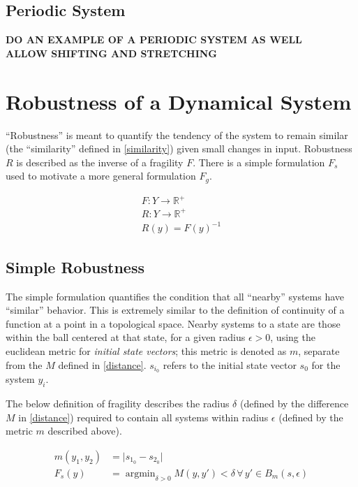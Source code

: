 \documentclass{article}
\DeclareMathOperator*{\argmin}{argmin}
\begin{document}
\subsection{Periodic System}
\textbf{DO AN EXAMPLE OF A PERIODIC SYSTEM AS WELL \\
  ALLOW SHIFTING AND STRETCHING}

\section{Robustness of a Dynamical System} \label{robustness}
``Robustness'' is meant to quantify the tendency of the system to remain similar (the ``similarity'' defined in \ref{similarity}) given small changes in input. Robustness $R$ is described as the inverse of a fragility $F$. There is a simple formulation $F_s$ used to motivate a more general formulation $F_g$.

\begin{align}
  F : Y \to \mathbb{R}^+ \\
  R : Y \to \mathbb{R}^+ \\
  R(y) = F(y)^{-1}
\end{align}

\subsection{Simple Robustness}
The simple formulation quantifies the condition that all ``nearby'' systems have ``similar'' behavior. This is extremely similar to the definition of continuity of a function at a point in a topological space. Nearby systems to a state are those within the ball centered at that state, for a given radius $\epsilon > 0$, using the euclidean metric for \textit{initial state vectors}; this metric is denoted as $m$, separate from the $M$ defined in \eqref{distance}. $s_{i_0}$ refers to the initial state vector $s_0$ for the system $y_i$.

The below definition of fragility describes the radius $\delta$ (defined by the difference $M$ in \eqref{distance}) required to contain all systems within radius $\epsilon$ (defined by the metric $m$ described above).

\begin{align}
  m(y_1, y_2) &= \lvert s_{1_0} - s_{2_0} \rvert \label{example-metric} \\
  F_s(y) &= \argmin_{\delta > 0} M(y, y') < \delta \,\forall\, y' \in B_m(s, \epsilon)
\end{align}
\end{document}
